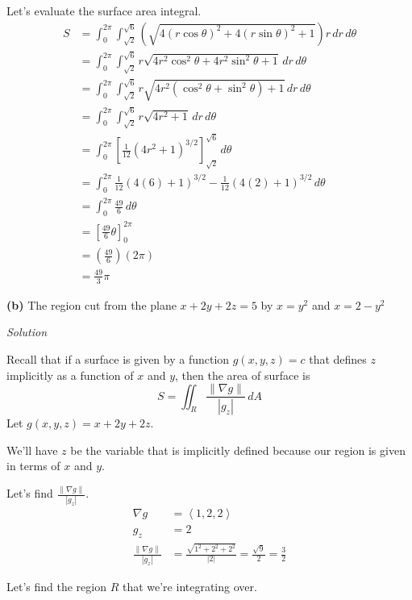 \documentclass{article}
\newcommand{\lrp}[1]{\left( #1 \right)}
\newcommand{\lra}[1]{\left\langle #1 \right\rangle}
\newcommand{\lrb}[1]{\left[ #1 \right]}
\newcommand{\norm}[1]{\left\lVert #1 \right\rVert}
\newcommand{\Solution}{\textit{Solution}}
\begin{document}
Let's evaluate the surface area integral.
\begin{align*}
    S&=\int_0^{2\pi}\int_{\sqrt{2}}^{\sqrt{6}}\lrp{\sqrt{4(r\cos\theta)^2+4(r\sin\theta)^2+1}}r\,dr\,d\theta\\
    &=\int_0^{2\pi}\int_{\sqrt{2}}^{\sqrt{6}}r\sqrt{4r^2\cos^2\theta+4r^2\sin^2\theta+1}\,dr\,d\theta\\
    &=\int_0^{2\pi}\int_{\sqrt{2}}^{\sqrt{6}}r\sqrt{4r^2\lrp{\cos^2\theta+\sin^2\theta}+1}\,dr\,d\theta\\
    &=\int_0^{2\pi}\int_{\sqrt{2}}^{\sqrt{6}}r\sqrt{4r^2+1}\,dr\,d\theta\tag{$\cos^2\theta+\sin^2\theta=1$}\\
    &=\int_0^{2\pi}\lrb{\frac{1}{12}(4r^2+1)^{3/2}}_{\sqrt{2}}^{\sqrt{6}}\,d\theta\tag{or do $u$-sub, $u=4r^2+1$}\\
    &=\int_0^{2\pi}\frac{1}{12}\lrp{4(6)+1}^{3/2}-\frac{1}{12}\lrp{4(2)+1}^{3/2}\,d\theta\\
    &=\int_0^{2\pi}\frac{49}{6}\,d\theta\tag{use a calculator}\\
    &=\lrb{\frac{49}{6}\theta}_0^{2\pi}\\
    &=\lrp{\frac{49}{6}}\lrp{2\pi}\\
    &=\boxed{\frac{49}{3}\pi}
\end{align*}
{}\textbf{(b)} The region cut from the plane $x+2y+2z=5$ by $x=y^2$ and $x=2-y^2$

\Solution

Recall that if a surface is given by a function $g(x,y,z)=c$ that defines $z$ implicitly as a function of $x$ and $y$, then the area of surface is
\begin{equation*}
    S=\iint_R \frac{\norm{\nabla g}}{\left| g_z\right|}\,dA
\end{equation*}
Let $g(x,y,z)=x+2y+2z$. 

We'll have $z$ be the variable that is implicitly defined because our region is given in terms of $x$ and $y$.

Let's find $\displaystyle\frac{\norm{\nabla g}}{\left| g_z\right|} $.
\begin{align*}
    \nabla g&=\lra{1,2,2}\\
    g_z&=2\\
    \frac{\norm{\nabla g}}{\left|g_z\right|}&=\frac{\sqrt{1^2+2^2+2^2}}{\left|2\right|}=\frac{\sqrt{9}}{2}=\frac{3}{2}
\end{align*}

Let's find the region $R$ that we're integrating over.
\end{document}
